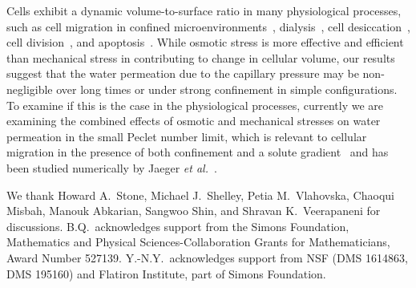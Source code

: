 \documentclass[prb,preprint,showpacs,preprintnumbers,amsmath,amssymb,longbibliography]{revtex4-1}
\begin{document}
Cells exhibit a dynamic volume-to-surface ratio in 
many physiological processes, such as 
cell migration in confined microenvironments~\cite{StrokaJiangChenEtAl2014_Cell, papadopoulos2008aquaporins}, 
dialysis~\cite{wan2006}, cell desiccation~\cite{vogl2014effect}, cell division~\cite{OdermattMiettinenKangEtAl2020_bioRxiv}, and
apoptosis~\cite{marchetti1996mitochondrial}.
While osmotic stress  is more effective and efficient than mechanical stress in contributing to change in cellular volume, our results suggest that the water permeation due to the capillary pressure may be non-negligible over long times or under strong confinement in simple configurations. 
To examine if this is the case in the physiological processes,  currently we are examining the combined effects of osmotic and mechanical stresses on water permeation in the small Peclet number limit, which is relevant to cellular migration in the presence of both confinement and a solute gradient~\cite{StrokaJiangChenEtAl2014_Cell} and has been studied numerically by Jaeger {\em et al.}~\cite{jae-car-med-try1999}.


\acknowledgments
We thank Howard A.~Stone, Michael J.~Shelley, Petia M.~Vlahovska,
Chaoqui Misbah, Manouk Abkarian, Sangwoo Shin, and Shravan
K.~Veerapaneni for discussions. B.Q.~acknowledges support from the
Simons Foundation, Mathematics and Physical Sciences-Collaboration
Grants for Mathematicians, Award Number 527139.  Y.-N.Y.~acknowledges
support from NSF (DMS 1614863, DMS 195160) and Flatiron Institute, part
of Simons Foundation.

\bigskip
 

\end{document}
